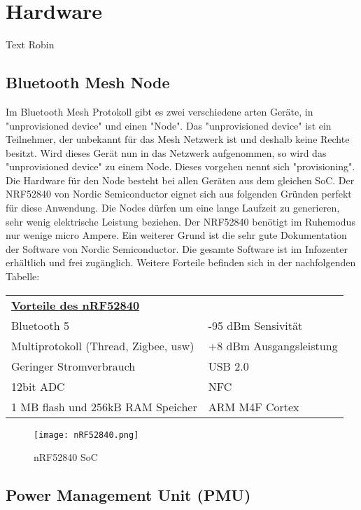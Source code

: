 \clearpage
\section{Hardware}\label{sec:Hardware}
Text Robin


\subsection{Bluetooth Mesh Node}\label{subsec:BMN}
Im Bluetooth Mesh Protokoll gibt es zwei verschiedene arten Geräte, in "unprovisioned device" und einen "Node". Das "unprovisioned device" ist ein Teilnehmer, der unbekannt für das Mesh Netzwerk ist und deshalb keine Rechte besitzt. Wird dieses Gerät nun in das Netzwerk aufgenommen, so wird das "unprovisioned device" zu einem Node. Dieses vorgehen nennt sich "provisioning". Die Hardware für den Node besteht bei allen Geräten aus dem gleichen SoC. Der NRF52840 von Nordic Semiconductor eignet sich aus folgenden Gründen perfekt für diese Anwendung. Die Nodes dürfen um eine lange Laufzeit zu generieren, sehr wenig elektrische Leistung beziehen. Der NRF52840 benötigt im Ruhemodus nur wenige micro Ampere. Ein weiterer Grund ist die sehr gute Dokumentation der Software von Nordic Semiconductor. Die gesamte Software ist im Infozenter erhältlich und frei zugänglich. Weitere Forteile befinden sich in der nachfolgenden Tabelle:

\begin{table}[h]
	\begin{tabular}{ll}
		\multicolumn{2}{l}{{\ul \textbf{Vorteile des nRF52840}}}       \\
		Bluetooth 5                          & -95 dBm Sensivität      \\
		Multiprotokoll (Thread, Zigbee, usw) & +8 dBm Ausgangsleistung \\
		Geringer Stromverbrauch              & USB 2.0                 \\
		12bit ADC                            & NFC                     \\
		1 MB flash und 256kB RAM Speicher    & ARM M4F Cortex         
	\end{tabular}
\end{table}

\begin{figure}[h]
	\centering
	\texttt{[image: nRF52840.png]}
	\caption{nRF52840 SoC}
	\label{img:nRF52840}
\end{figure} 


\subsection{Power Management Unit (PMU)}\label{subsec:PMU}